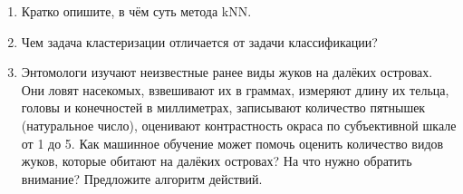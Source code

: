 \documentclass[a4paper,10pt]{article}
\begin{document}
\begin{enumerate}
	\item Кратко опишите, в чём суть метода kNN.
	\vspace{8cm}
	\item Чем задача кластеризации отличается от задачи классификации?
	\vspace{9cm}
	
	\item Энтомологи изучают неизвестные ранее виды жуков на далёких островах. Они ловят насекомых, взвешивают их в граммах, измеряют длину их тельца, головы и конечностей в миллиметрах, записывают количество пятнышек (натуральное число), оценивают контрастность окраса по субъективной шкале от 1 до 5. Как машинное обучение может помочь оценить количество видов жуков, которые обитают на далёких островах? На что нужно обратить внимание? Предложите алгоритм действий.
	\vspace{8cm}
\end{enumerate}
\end{document}
